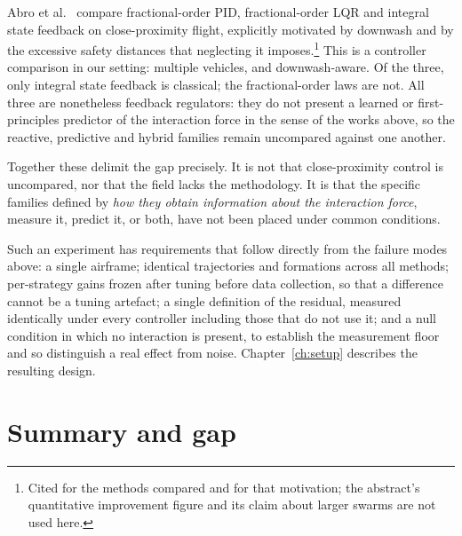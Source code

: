 Abro et al.~\cite{abro2025fractional} compare fractional-order PID, fractional-order LQR and
integral state feedback on close-proximity flight, explicitly motivated by downwash and by the
excessive safety distances that neglecting it imposes.\footnote{Cited for the methods compared and
for that motivation; the abstract's quantitative improvement figure and its claim about larger
swarms are not used here.} This is a controller comparison in our setting: multiple vehicles, and
downwash-aware. Of the three, only integral state feedback is classical; the fractional-order laws
are not. All three are nonetheless feedback regulators: they do not present a learned or
first-principles predictor of the interaction force in the sense of the works above, so the
reactive, predictive and hybrid families remain uncompared against one another.

Together these delimit the gap precisely. It is not that close-proximity control is uncompared, nor
that the field lacks the methodology. It is that the specific families defined by \emph{how they
obtain information about the interaction force}, measure it, predict it, or both, have not
been placed under common conditions.

Such an experiment has requirements that follow directly from the failure modes above: a single
airframe; identical trajectories and formations across all methods; per-strategy gains frozen after
tuning before data collection, so that a difference cannot be a tuning artefact; a single definition
of the residual, measured identically under every controller
including those that do not use it; and a null condition in which no interaction is present, to
establish the measurement floor and so distinguish a real effect from noise. Chapter~\ref{ch:setup}
describes the resulting design.

\section{Summary and gap}
\label{sec:rw-gap}

